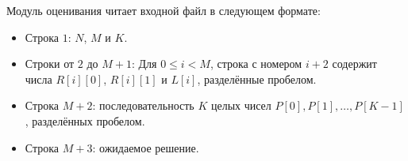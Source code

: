 Модуль оценивания читает входной файл в следующем формате:

\begin{itemize}
\item Строка $1$: $N$, $M$ и $K$.
\item Строки от $2$ до $M+1$: Для $0 \le i < M$, строка с номером $i+2$ содержит числа $R[i][0]$, $R[i][1]$ и $L[i]$, разделённые пробелом.
\item Строка $M+2$: последовательность $K$ целых чисел $P[0], P[1],\ldots, P[K-1]$, разделённых пробелом.
\item Строка $M+3$: ожидаемое решение.
\end{itemize}

